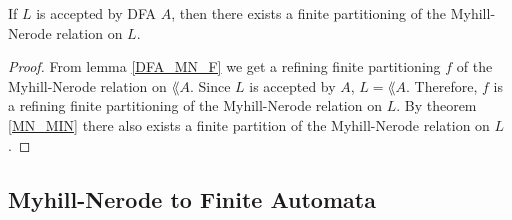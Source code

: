                                         \begin{theorem}
                                            If $L$ is accepted by DFA $A$, then there exists a finite partitioning of the Myhill-Nerode relation on $L$.
                                        \end{theorem}
                                        \begin{proof}
                                            From lemma \ref{DFA_MN_F} we get a refining finite partitioning $f$ of the Myhill-Nerode relation on $\lang{A}$. 
                                            Since $L$ is accepted by $A$, $L = \lang{A}$. 
                                            Therefore, $f$ is a refining finite partitioning of the Myhill-Nerode relation on $L$.
                                            By theorem \ref{MN_MIN} there also exists a finite partition of the Myhill-Nerode relation on $L$.
                                        \end{proof}


                                        \subsection{Myhill-Nerode to Finite Automata}

                                        \paragraph{}


